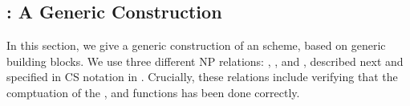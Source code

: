

\subsection{\CUASGen: A Generic \UAS Construction}
\label{ssec:generic-construction-uas}

In this section, we give a generic construction of an \UAS scheme, based on
generic building blocks. We use three different NP relations: \RelIss, \RelSig,
and \RelIns, described next and specified in CS notation \cite{cs97} in
. Crucially, these relations include verifying that the
comptuation of the \fissue, \feval and \finsp functions has been done correctly.

